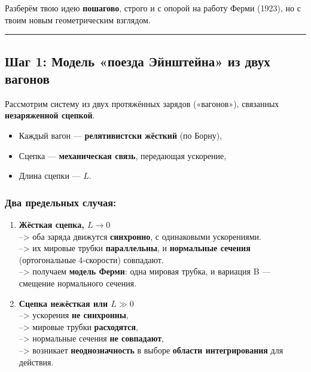 \documentclass[11pt]{article}
\providecommand{\tightlist}{%
      \setlength{\itemsep}{0pt}\setlength{\parskip}{0pt}}
\begin{document}
Разберём твою идею \textbf{пошагово}, строго и с опорой на работу Ферми
(1923), но с твоим новым геометрическим взглядом.

\begin{center}\rule{0.5\linewidth}{\linethickness}\end{center}

\subsection{ Шаг 1: Модель «поезда Эйнштейна» из двух вагонов}

Рассмотрим систему из двух протяжённых зарядов («вагонов»), связанных
\textbf{незаряженной сцепкой}.

\begin{itemize}
\tightlist
\item
  Каждый вагон --- \textbf{релятивистски жёсткий} (по Борну),
\item
  Сцепка --- \textbf{механическая связь}, передающая ускорение,
\item
  Длина сцепки --- \(L\).
\end{itemize}

\subsubsection{Два предельных случая:}

\begin{enumerate}
\def\labelenumi{\arabic{enumi}.}
\item
  \textbf{Жёсткая сцепка, \(L \to 0\)}\\
  --> оба заряда движутся \textbf{синхронно}, с одинаковыми ускорениями.\\
  --> их мировые трубки \textbf{параллельны}, и \textbf{нормальные
  сечения} (ортогональные 4-скорости) совпадают.\\
  --> получаем \textbf{модель Ферми}: одна мировая трубка, и вариация B
  --- смещение нормального сечения.
\item
  \textbf{Сцепка нежёсткая или \(L \gg 0\)}\\
  --> ускорения \textbf{не синхронны},\\
  --> мировые трубки \textbf{расходятся},\\
  --> нормальные сечения \textbf{не совпадают},\\
  --> возникает \textbf{неоднозначность} в выборе \textbf{области
  интегрирования} для действия.
\end{enumerate}
\end{document}
